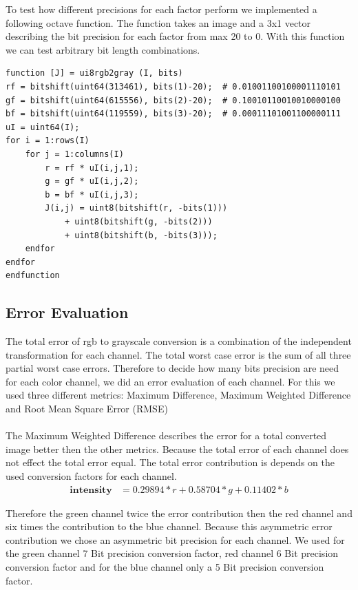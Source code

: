 \documentclass[a4paper]{scrartcl}
\begin{document}
	To test how different precisions for each factor perform we implemented a following octave function. The function takes an image and a 3x1 vector describing the bit precision for each factor from max 20 to 0. With this function we can test arbitrary bit length combinations.

\begin{minipage}{\linewidth}
\begin{lstlisting}
function [J] = ui8rgb2gray (I, bits)
rf = bitshift(uint64(313461), bits(1)-20);  # 0.01001100100001110101
gf = bitshift(uint64(615556), bits(2)-20);  # 0.10010110010010000100
bf = bitshift(uint64(119559), bits(3)-20);  # 0.00011101001100000111
uI = uint64(I);
for i = 1:rows(I)
	for j = 1:columns(I)
		r = rf * uI(i,j,1);
		g = gf * uI(i,j,2);
		b = bf * uI(i,j,3);
		J(i,j) = uint8(bitshift(r, -bits(1))) 
			+ uint8(bitshift(g, -bits(2))) 
			+ uint8(bitshift(b, -bits(3)));
	endfor
endfor
endfunction
\end{lstlisting}
\end{minipage}	

    \subsection{Error Evaluation}

	The total error of rgb to grayscale conversion is a combination of the independent transformation for each channel. The total worst case error is the sum of all three partial worst case errors. Therefore to decide how many bits precision are need for each color channel, we did an error evaluation of each channel. For this we used three different metrics: Maximum Difference, Maximum Weighted Difference and Root Mean Square Error (RMSE)

\paragraph{}
The Maximum Weighted Difference describes the error for a total converted image better then the other metrics. Because the total error of each channel does not effect the total error equal. The total error contribution is depends on the used conversion factors for each channel.
\begin{align*}
 \textbf{intensity} &= 0.29894*r + 0.58704*g + 0.11402*b
\end{align*}


Therefore the green channel twice the error contribution then the red channel and six times the contribution to the blue channel. Because this asymmetric error contribution we chose an asymmetric bit precision for each channel. We used for the green channel 7 Bit precision conversion factor, red channel 6 Bit precision conversion factor and for the blue channel only a 5 Bit precision conversion factor.
\end{document}
